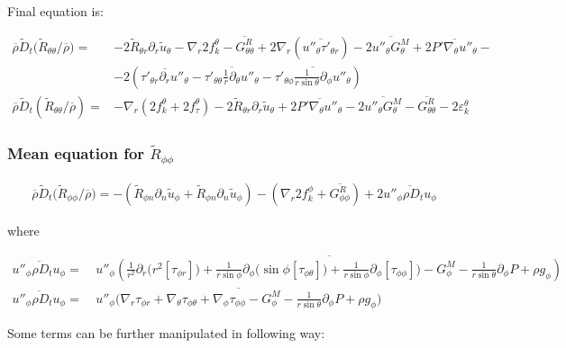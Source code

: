 \documentclass[10pt,paper=a4]{report}
\newcommand{\eht}{\overline}
\newcommand{\fht}{\widetilde}
\begin{document}
\noindent
Final equation is:

\begin{align}
\eht{\rho}\fht{D}_t \big( \fht{R}_{\theta \theta} / \eht{\rho} \big) = & -2\fht{R}_{\theta r}\partial_r \fht{u}_\theta -\nabla_r 2 f_k^\theta - \eht{G_{\theta \theta}^R} + 2\nabla_r (\eht{u''_\theta \tau'_{\theta r}}) - 2\eht{u''_\theta G_\theta^M} + 2\eht{P'\nabla_\theta u''_\theta} - \nonumber \\ 
& - 2 \left(\eht{\tau'_{\theta r}\partial_r u''_\theta} - \eht{\tau'_{\theta \theta} \frac{1}{r}\partial_\theta u''_\theta} - \eht{\tau'_{\theta \phi} \frac{1}{r\sin{\theta}} \partial_\phi u''_\theta} \right) \\
\eht{\rho}\fht{D}_t \left( \fht{R}_{\theta \theta} / \eht{\rho} \right) = & -\nabla_r ( 2 f_k^\theta + 2 f_\tau^\theta ) - 2\fht{R}_{\theta r}\partial_r \fht{u}_\theta +2\eht{P' \nabla_\theta u''_\theta}  - 2\overline{u''_\theta G^{M}_\theta} - \eht{G^{R}_{\theta \theta}} - 2 \varepsilon_k^\theta 
\end{align}

\subsubsection{Mean equation for $\fht{R}_{\phi \phi}$}

\begin{align}
\eht{\rho}\fht{D}_t \big( \fht{R}_{\phi \phi} / \eht{\rho} \big) = -\left(\fht{R}_{\phi n}\partial_n \fht{u}_\phi + \fht{R}_{\phi n}\partial_n \fht{u}_\phi \right) -\left( \nabla_r 2 f_k^\phi + \eht{G_{\phi \phi}^R} \right) + 2  \eht{u''_\phi \rho D_t u_\phi} 
\end{align}

\noindent
where

\begin{align}
\eht{u''_\phi \rho D_t u_\phi} = & \ \eht{u''_\phi \left( \frac{1}{r^{2}} \partial_{r} \big(r^{2} [\tau_{\phi r}]\big) + \frac{1}{r\sin{\phi}}\partial_{\phi}\big(\sin{\phi}[\tau_{\phi \theta}]\big) + \frac{1}{r\sin{\phi}}\partial_{\phi}[\tau_{\phi \phi}]\big) - G_\phi^M - \frac{1}{r\sin{\theta}} \partial_{\phi} P + \rho g_\phi \right) } \\
\eht{u''_\phi \rho D_t u_\phi} = & \ \eht{u''_\phi \big( \nabla_r \tau_{\phi r} + \nabla_\theta \tau_{\phi \theta} + \nabla_\phi \tau_{\phi \phi} - G_\phi^M - \frac{1}{r\sin{\theta}} \partial_{\phi} P + \rho g_\phi \big) }
\end{align}

\noindent
Some terms can be further manipulated in following way:
\end{document}
